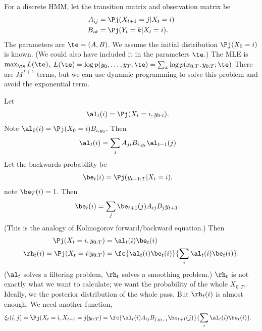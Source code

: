 For a discrete HMM, let the transition matrix and observation matrix be
\begin{align}
A_{ij}&= \Pj(X_{t+1}=j|X_t=i)\\
B_{ik}&= \Pj(Y_t=k|X_t=i).
\end{align}
The parameters are $\te=(A,B)$. We assume the initial distribution $\Pj(X_0=i)$ is known. (We could also have included it in the parameters $\te$.)
The MLE is $\max_\te L(\te)$, $L(\te)=\log p(y_0,\ldots, y_T;\te) = \sum_x \log p(x_{0:T},y_{0:T};\te)$
There are $M^{T+1}$ terms, but we can use dynamic programming to solve this problem and avoid the exponential term. 

Let
\begin{align}
\al_t(i) &=\Pj(X_t=i, y_{0:t}).
\end{align}
Note $\al_0(i) =\Pj(X_0=i) B_{i,y_0}$. Then
\begin{align}
\al_t(i) &=\sum_j A_{ji}B_{i,y_t} \al_{t-1}(j)
\end{align}
Let the backwards probability be
\begin{align}
\be_t(i) &= \Pj(y_{t+1:T}|X_t=i),
\end{align}
note $\be_T(i)=1$. Then
\begin{align}
\be_t(i) &= \sum_j \be_{t+1}(j) A_{ij}B_jy_{t+1}.
\end{align}
(This is the analogy of Kolmogorov forward/backward equation.) 
Then 
\begin{align}
\Pj(X_t=i, y_{0:T}) &= \al_t(i)\be_t(i)\\
\rh_t(i)=
\Pj(X_t=i|y_{0:T}) &= \fc{\al_t(i)\be_t(i)}{\sum_i \al_t(i) \be_t(i)}.
\end{align}
($\al_t$ solves a filtering problem, $\rh_t$ solves a smoothing problem.) $\rh_t$ is not exactly what we want to calculate; we want the probability of the whole $X_{0:T}$. Ideally, we the posterior distribution of the whole pass. But $\rh_t(i)$ is almost enough. We need another function,
\begin{align}
\xi_t(i,j) &= \Pj(X_t=i,X_{t+1}=j|y_{0:T})=\fc{\al_t(i) A_{ij} B_{j,y_{t+1}} \be_{t+1}(j)}{\sum_i \al_t(i) \be_t(i)}.
\end{align}

